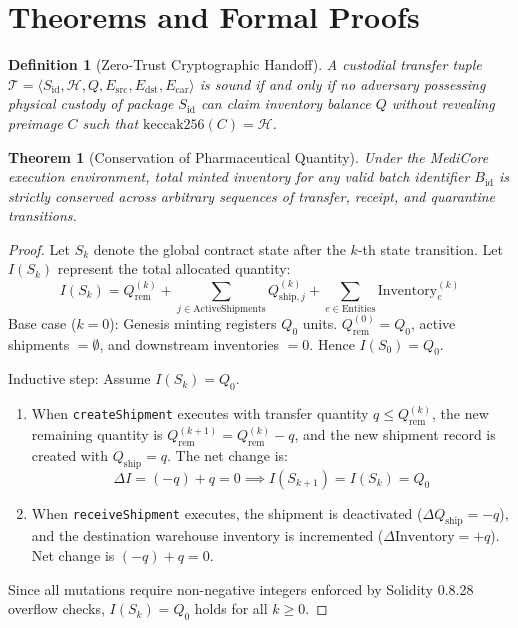 \documentclass[pdflatex,sn-mathphys-num]{sn-jnl}
\theoremstyle{thmstyleone}
\newtheorem{theorem}{Theorem}
\theoremstyle{thmstyletwo}
\theoremstyle{thmstylethree}
\newtheorem{definition}{Definition}
\begin{document}
\section{Theorems and Formal Proofs}\label{sec9}

\begin{definition}[Zero-Trust Cryptographic Handoff]\label{def:handoff}
A custodial transfer tuple $\mathcal{T} = \langle S_{\text{id}}, \mathcal{H}, Q, E_{\text{src}}, E_{\text{dst}}, E_{\text{car}} \rangle$ is sound if and only if no adversary possessing physical custody of package $S_{\text{id}}$ can claim inventory balance $Q$ without revealing preimage $C$ such that $\text{keccak256}(C) = \mathcal{H}$.
\end{definition}

\begin{theorem}[Conservation of Pharmaceutical Quantity]\label{thm:conservation}
Under the MediCore execution environment, total minted inventory for any valid batch identifier $B_{\text{id}}$ is strictly conserved across arbitrary sequences of transfer, receipt, and quarantine transitions.
\end{theorem}

\begin{proof}
Let $S_k$ denote the global contract state after the $k$-th state transition. Let $I(S_k)$ represent the total allocated quantity:
\[
I(S_k) = Q_{\text{rem}}^{(k)} + \sum_{j \in \text{ActiveShipments}} Q_{\text{ship}, j}^{(k)} + \sum_{e \in \text{Entities}} \text{Inventory}_e^{(k)}
\]
Base case ($k=0$): Genesis minting registers $Q_0$ units. $Q_{\text{rem}}^{(0)} = Q_0$, active shipments $= \emptyset$, and downstream inventories $= 0$. Hence $I(S_0) = Q_0$.

Inductive step: Assume $I(S_k) = Q_0$.
\begin{enumerate}
    \item When \texttt{createShipment} executes with transfer quantity $q \le Q_{\text{rem}}^{(k)}$, the new remaining quantity is $Q_{\text{rem}}^{(k+1)} = Q_{\text{rem}}^{(k)} - q$, and the new shipment record is created with $Q_{\text{ship}} = q$. The net change is:
    \[
    \Delta I = (-q) + q = 0 \implies I(S_{k+1}) = I(S_k) = Q_0
    \]
    \item When \texttt{receiveShipment} executes, the shipment is deactivated ($\Delta Q_{\text{ship}} = -q$), and the destination warehouse inventory is incremented ($\Delta \text{Inventory} = +q$). Net change is $(-q) + q = 0$.
\end{enumerate}
Since all mutations require non-negative integers enforced by Solidity 0.8.28 overflow checks, $I(S_k) = Q_0$ holds for all $k \ge 0$.
\end{proof}
\end{document}
